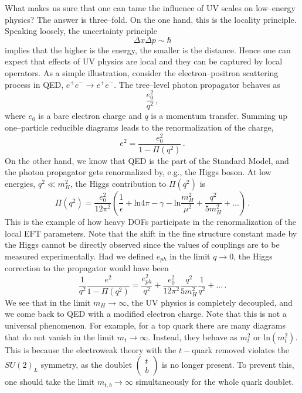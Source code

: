 \documentclass[11pt,a4paper]{article}
\newcommand{\be}{\begin{equation}}
\newcommand{\ee}{\end{equation}}
\begin{document}
What makes us sure that one can tame the influence of UV scales on low--energy physics? The answer is three--fold. On the one hand, this is the locality principle. Speaking loosely, the uncertainty principle
\be
\Delta x\Delta p\sim\hbar
\ee
implies that the higher is the energy, the smaller is the distance.
Hence one can expect that effects of UV physics are local and they can be captured by local operators. As a simple illustration, consider the electron--positron scattering process in QED, $e^+e^-\rightarrow e^+e^-$. The tree--level photon propagator behaves as
\be
\dfrac{e_0^2}{q^2} \,,
\ee
where $e_0$ is a bare electron charge and $q$ is a momentum transfer.
Summing up one--particle reducible diagrams leads to the renormalization of the charge,
\be
e^2=\dfrac{e_0^2}{1-\Pi(q^2)} \,.
\ee
On the other hand, we know that QED is the part of the Standard Model, and the photon propagator gets renormalized by, e.g., the Higgs boson. At low energies, $q^2\ll m_H^2$, the Higgs contribution to $\Pi(q^2)$ is
\be
\Pi(q^2)=\dfrac{e_0^2}{12\pi^2}\left(\dfrac{1}{\epsilon}+\text{ln}4\pi -\gamma-\text{ln}\dfrac{m_H^2}{\mu^2}+\dfrac{q^2}{5m_H^2}+...\right)\,.
\ee
This is the example of how heavy DOFs participate in the renormalization of the local EFT parameters.
Note that the shift in the fine structure constant made by the Higgs cannot be directly observed since the values of couplings are to be measured experimentally.
Had we defined $e_{ph}$ in the limit $q\rightarrow 0$, the Higgs correction to the propagator would have been
\be
\dfrac{1}{q^2}\dfrac{e^2}{1-\Pi(q^2)}=\dfrac{e_{ph}^2}{q^2}+\dfrac{e_0^2}{12\pi^2}\dfrac{q^2}{5m_H^2}\dfrac{1}{q^2}+...\,.
\ee
We see that in the limit $m_H\rightarrow\infty$, the UV physics is completely decoupled, and we come back to QED with a modified electron charge. Note that this is not a universal phenomenon. For example, for a top quark there are many diagrams that do not vanish in the limit $m_t\rightarrow\infty$. Instead, they behave as $m_t^2$ or $\text{ln}(m_t^2)$. This is because the electroweak theory with the $t-$quark removed violates the $SU(2)_L$ symmetry, as the doublet $\left(\begin{matrix}
t \\
b
\end{matrix}\right)$ is no longer present.
To prevent this, one should take the limit $m_{t,b}\rightarrow\infty$ simultaneously for the whole quark doublet.
\end{document}
